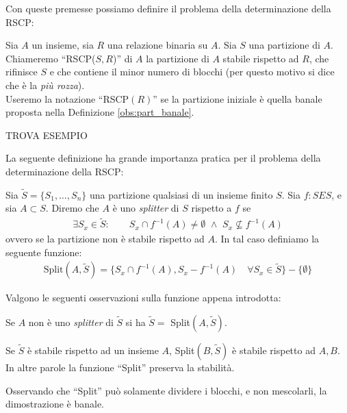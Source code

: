 Con queste premesse possiamo definire il problema della determinazione della RSCP:
\begin{definition}
    Sia $A$ un insieme, sia $R$ una relazione binaria su $A$. Sia $S$ una partizione di $A$. Chiameremo ``RSCP($S,R$)'' di $A$ la partizione di $A$ stabile rispetto ad $R$, che rifinisce $S$ e che contiene il minor numero di blocchi (per questo motivo si dice che è la \emph{più rozza}).\\
    Useremo la notazione ``RSCP$(R)$'' se la partizione iniziale è quella banale proposta nella Definizione \ref{obs:part_banale}.
\end{definition}
\begin{example}
    TROVA ESEMPIO
\end{example}
La seguente definizione ha grande importanza pratica per il problema della determinazione della RSCP:
\begin{definition}
    \label{def:funz_split}
    Sia $\widetilde{S} = \{S_1,\dots,S_n\}$ una partizione qualsiasi di un insieme finito $S$. Sia $f: S E S$, e sia $A \subset S$. Diremo che $A$ è uno \emph{splitter} di $S$ rispetto a $f$ se
    \begin{gather*}
        \exists S_x \in \widetilde{S} : \qquad S_x \cap f^{-1}(A) \neq \emptyset \,\,\land\,\, S_x \not\subseteq f^{-1}(A)
    \end{gather*}
    ovvero se la partizione non è stabile rispetto ad $A$. In tal caso definiamo la seguente funzione:
    \begin{gather*}
        \text{Split}(A,\widetilde{S}) = \{S_x \cap f^{-1}(A), S_x - f^{-1}(A) \quad \forall S_x \in \widetilde{S}\} - \{\emptyset\}
    \end{gather*}
\end{definition}
Valgono le seguenti osservazioni sulla funzione appena introdotta:
\begin{observation}
    Se $A$ non è uno \emph{splitter} di $\widetilde{S}$ si ha $\widetilde{S} = $ Split$(A,\widetilde{S})$.
\end{observation}
\begin{observation}
    \label{obs:split_eredita}
    Se $\widetilde{S}$ è stabile rispetto ad un insieme $A$, Split$(B,\widetilde{S})$ è stabile rispetto ad $A,B$. In altre parole la funzione ``Split'' preserva la stabilità.
\end{observation}
\begin{proof2}
    Osservando che ``Split'' può solamente dividere i blocchi, e non mescolarli, la dimostrazione è banale.
\end{proof2}
